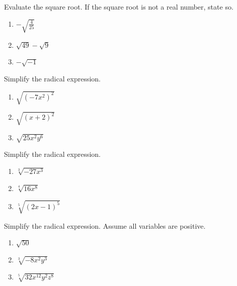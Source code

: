 \documentclass[en,11pt]{elegantbook}
\let\BeginKnitrBlock\begin \let\EndKnitrBlock\end
\begin{document}
\BeginKnitrBlock{exercise}
\protect\hypertarget{exr:unnamed-chunk-85}{}{\label{exr:unnamed-chunk-85} }
Evaluate the square root. If the square root is not a real number, state so.

\begin{enumerate}
\def\labelenumi{\arabic{enumi}.}

\item
  \(-\sqrt{\frac{4}{25}}\)
\item
  \(\sqrt{49}-\sqrt{9}\)
\item
  \(-\sqrt{-1}\)\null
\end{enumerate}
\EndKnitrBlock{exercise}

\BeginKnitrBlock{exercise}
\protect\hypertarget{exr:unnamed-chunk-86}{}{\label{exr:unnamed-chunk-86} }
Simplify the radical expression.

\begin{enumerate}
\def\labelenumi{\arabic{enumi}.}

\item
  \(\sqrt{(-7x^2)^2}\)
\item
  \(\sqrt{(x+2)^2}\)
\item
  \(\sqrt{25x^2y^6}\)
\end{enumerate}
\EndKnitrBlock{exercise}

\BeginKnitrBlock{exercise}
\protect\hypertarget{exr:unnamed-chunk-87}{}{\label{exr:unnamed-chunk-87} }
Simplify the radical expression.

\begin{enumerate}
\def\labelenumi{\arabic{enumi}.}

\item
  \(\sqrt[3]{-27x^3}\)
\item
  \(\sqrt[4]{16x^8}\)
\item
  \(\sqrt[5]{(2x-1)^5}\)
\end{enumerate}
\EndKnitrBlock{exercise}

\BeginKnitrBlock{exercise}
\protect\hypertarget{exr:unnamed-chunk-88}{}{\label{exr:unnamed-chunk-88} }
Simplify the radical expression. Assume all variables are positive.

\begin{enumerate}
\def\labelenumi{\arabic{enumi}.}

\item
  \(\sqrt{50}\)
\item
  \(\sqrt[3]{-8x^2y^3}\)
\item
  \(\sqrt[5]{32x^{12}y^2z^8}\)
\end{enumerate}
\EndKnitrBlock{exercise}
\end{document}
